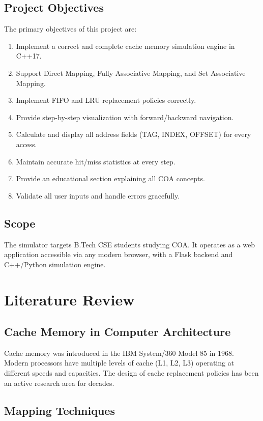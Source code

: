 \documentclass[12pt,a4paper]{report}
\begin{document}
\section{Project Objectives}
The primary objectives of this project are:
\begin{enumerate}
  \item Implement a correct and complete cache memory simulation engine in C++17.
  \item Support Direct Mapping, Fully Associative Mapping, and Set Associative Mapping.
  \item Implement FIFO and LRU replacement policies correctly.
  \item Provide step-by-step visualization with forward/backward navigation.
  \item Calculate and display all address fields (TAG, INDEX, OFFSET) for every access.
  \item Maintain accurate hit/miss statistics at every step.
  \item Provide an educational section explaining all COA concepts.
  \item Validate all user inputs and handle errors gracefully.
\end{enumerate}

\section{Scope}
The simulator targets B.Tech CSE students studying COA. It operates as a web
application accessible via any modern browser, with a Flask backend and C++/Python
simulation engine.

\chapter{Literature Review}

\section{Cache Memory in Computer Architecture}
Cache memory was introduced in the IBM System/360 Model 85 in 1968. Modern
processors have multiple levels of cache (L1, L2, L3) operating at different
speeds and capacities. The design of cache replacement policies has been an
active research area for decades.

\section{Mapping Techniques}
\end{document}
